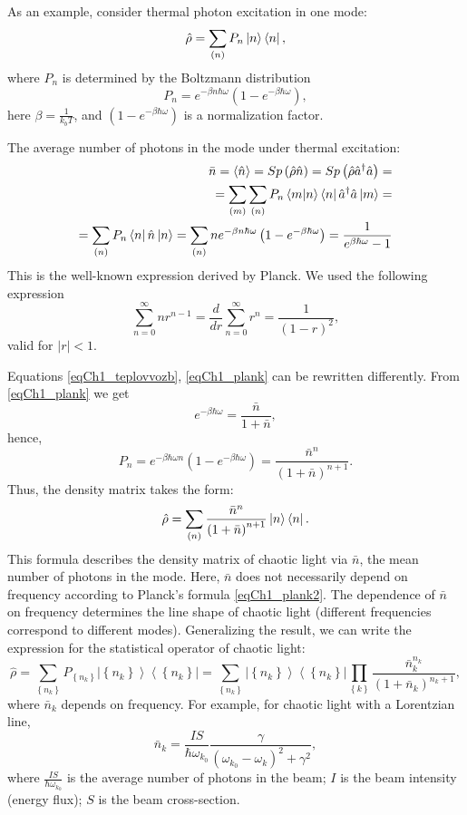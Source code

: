 As an example, consider thermal photon excitation in one mode:
\begin{equation}
\hat{\rho} = \sum_{(n)}
P_n\ket{n}\bra{n},
\label{eqCh1_teplovvozb}
\end{equation}
where $P_n$ is determined by the Boltzmann distribution
\[
P_n = e^{-\beta n \hbar \omega}\left(1  -  e^{-\beta \hbar \omega}\right),
\]
here $\beta = \frac{1}{k_b T}$, and $\left(1  -  e^{-\beta \hbar
  \omega}\right)$ is a normalization factor. 

The average number of photons in the mode under thermal excitation:
\begin{eqnarray}
\bar{n} = \left<\hat{n}\right> =  Sp \left(\hat{\rho}\hat{n}\right) = 
Sp \left(\hat{\rho}\hat{a}^{\dag}\hat{a}\right) = 
\nonumber \\
=\sum_{(m)}\sum_{(n)}
P_n\bra{m}\ket{n}\bra{n}\hat{a}^{\dag}\hat{a}\ket{m}
= 
\nonumber \\
= \sum_{(n)}
P_n\bra{n}\hat{n}\ket{n} = \sum_{(n)} n
e^{-\beta n \hbar \omega}\left(1  -  e^{-\beta \hbar \omega}\right) = 
\frac{1}{e^{\beta \hbar \omega} - 1}
\label{eqCh1_plank}
\end{eqnarray}
This is the well-known expression derived by Planck. We used the following expression
\[
\sum_{n=0}^{\infty} n r^{n -1} = \frac{d}{d r} \sum_{n=0}^{\infty}
r^{n} = \frac{1}{\left(1 - r\right)^2},
\]
valid for $\left|r\right| < 1$.

Equations \eqref{eqCh1_teplovvozb}, \eqref{eqCh1_plank} can be rewritten differently. From \eqref{eqCh1_plank} we get 
\[
e^{-\beta \hbar \omega} = \frac{\bar{n}}{1 + \bar{n}},
\]
hence, 
\begin{equation}
P_n = e^{-\beta \hbar \omega n} \left(1  -  e^{-\beta \hbar
  \omega}\right) = \frac{\bar{n}^n}{\left(1 + \bar{n}\right)^{n+1}}.
\label{eqCh1_plank2}
\end{equation}
Thus, the density matrix takes the form:
\[
\hat{\rho} = \sum_{(n)}\frac{\bar{n}^n}{\left(1 + \bar{n}\right)^{n+1}}\ket{n}\bra{n}.
\]
This formula describes the density matrix of chaotic light via $\bar{n}$, the mean number of photons in the mode. Here, $\bar{n}$ does not necessarily depend on frequency according to Planck's formula \eqref{eqCh1_plank2}. The dependence of $\bar{n}$ on frequency determines the line shape of chaotic light (different frequencies correspond to different modes). Generalizing the result, we can write the expression for the statistical operator of chaotic light:  
\begin{equation}
\hat{\rho} = \sum_{\left\{n_k\right\}} P_{\left\{n_k\right\}} \left|\left\{n_k\right\}\right>\left<\left\{n_k\right\}\right| = 
\sum_{\left\{n_k\right\}} 
 \left|\left\{n_k\right\}\right>\left<\left\{n_k\right\}\right|
\prod_{\left\{k\right\}} 
\frac{\bar{n}_k^{n_k}}{\left(1 + \bar{n}_k\right)^{n_k+1}},
\label{eqCh1_102}
\end{equation}
where $\bar{n}_k$ depends on frequency. For example, for chaotic light with a Lorentzian line, 
\[
\bar{n}_k = \frac{I S}{\hbar \omega_{k_0}}
\frac{\gamma}{\left(\omega_{k_0} - \omega_{k}\right)^2 + \gamma^2},
\]
where $\frac{I S}{\hbar \omega_{k_0}}$ is the average number of photons in the beam; $I$ is the beam intensity (energy flux); $S$ is the beam cross-section.  